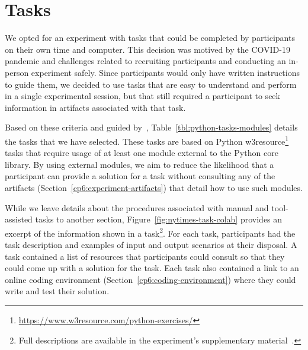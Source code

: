 
\section{Tasks}
\label{cp6:tasks}



We opted for an experiment with tasks that could be completed by participants on their own time and computer.
This decision was motived by the COVID-19 pandemic and challenges related to recruiting participants and conducting an in-person experiment safely\red{~\cite{}}. 
Since participants would only have written instructions to guide them, we decided to use tasks that are easy to understand and perform in a single experimental session, but that still required a participant  
to seek information in artifacts associated with that task.

% 


Based on these criteria and guided by~\cite{thiselton2019},
Table~\ref{tbl:python-tasks-modules} details the tasks that we have selected. 
These tasks are based on 
Python w3resource\footnote{\url{https://www.w3resource.com/python-exercises/}} tasks
that require usage of at least one module external to the Python core library.
By using external modules, we aim to reduce the likelihood that a participant 
can provide a solution for a task without consulting any of the artifacts (Section~\ref{cp6:experiment-artifacts})
that detail how to use such modules. 











While we leave details about the procedures associated with manual and tool-assisted tasks to another section, Figure~\ref{fig:nytimes-task-colab} provides an excerpt of the information shown in a task\footnote{Full descriptions are available in the experiment's supplementary material~\red{\cite{}}.}.
For each task, participants had the task description and examples of input and output scenarios at their disposal. A task contained a list of resources that participants could consult 
so that they could come up with a solution for the task.
Each task also contained a link to an online coding environment (Section~\ref{cp6:coding-environment})
where they could write and test their solution. 





